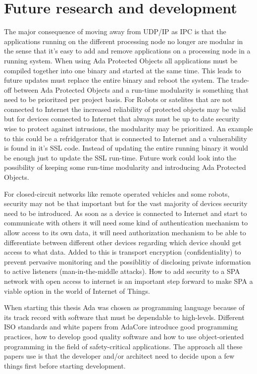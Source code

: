 \section{Future research and development}
The major consequence of moving away from UDP/IP as IPC is that the
applications running on the different processing node no longer are modular in
the sense that it's easy to add and remove applications on a processing node in
a running system. When using Ada Protected Objects all applications must be
compiled together into one binary and started at the same time. This leads to
future updates must replace the entire binary and reboot the system. The
trade-off between Ada Protected Objects and a run-time modularity is something
that need to be prioritzed per project basis. For Robots or satelites that are
not connected to Internet the increased reliability of protected objects may be
valid but for devices connected to Internet that always must be up to date
security wise to protect against intrusions, the modularity may be prioritized.
An example to this could be a refridgerator that is connected to Internet and a
vulnerability is found in it's SSL code. Instead of updating the entire running
binary it would be enough just to update the SSL run-time. Future work could
look into the possibility of keeping some run-time modularity and introducing
Ada Protected Objects.

For closed-circuit networks like remote operated vehicles and some robots,
security may not be that important but for the vast majority of devices
security need to be introduced. As soon as a device is connected to Internet
and start to communicate with others it will need some kind of authentication
mechanism to allow access to its own data, it will need authorization mechanism
to be able to differentiate between different other devices regarding which
device should get access to what data. Added to this is transport encryption
(confidentiality) to prevent pervasive monitoring and the possiblitiy of
disclosing private information to active listeners (man-in-the-middle attacks).
How to add security to a SPA network with open access to internet is an
important step forward to make SPA a viable option in the world of Internet of
Things.

When starting this thesis Ada was chosen as programming language because of its
track record with software that must be dependable to high-levels. Different
ISO standards and white papers from AdaCore introduce good programming
practices, how to develop good quality software and how to use object-oriented
programming in the field of safety-critical applications. The approach all
these papers use is that the developer and/or architect need to decide upon a
few things first before starting development.

